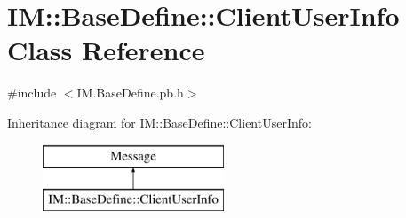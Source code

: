 \hypertarget{class_i_m_1_1_base_define_1_1_client_user_info}{}\section{I\+M\+:\+:Base\+Define\+:\+:Client\+User\+Info Class Reference}
\label{class_i_m_1_1_base_define_1_1_client_user_info}


{\ttfamily \#include $<$I\+M.\+Base\+Define.\+pb.\+h$>$}

Inheritance diagram for I\+M\+:\+:Base\+Define\+:\+:Client\+User\+Info\+:\begin{figure}[H]
\begin{center}
\leavevmode
\includegraphics[height=2.000000cm]{class_i_m_1_1_base_define_1_1_client_user_info}
\end{center}
\end{figure}
